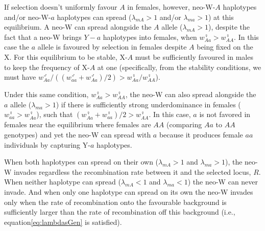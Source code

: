 \documentclass[12pt]{article}
\begin{document}
If selection doesn't uniformly favour $A$ in females, however, neo-W-$A$ haplotypes and/or neo-W-$a$ haplotypes can spread ($\lambda_{mA}>1$ and/or $\lambda_{ma}>1$) at this equilibrium.
A neo-W can spread alongside the $A$ allele ($\lambda_{mA}>1$), despite the fact that a neo-W brings $Y-a$ haplotypes into females, when $w_{Aa}^\female>w_{AA}^\female$.
In this case the $a$ allele is favoured by selection in females despite $A$ being fixed on the X.
For this equilibrium to be stable, X-$A$ must be sufficiently favoured in males to keep the frequency of X-$A$ at one (specifically, from the stability conditions, we must have $w_{Aa}^\male/((w_{aa}^\male+w_{Aa}^\male)/2)>w_{Aa}^\female/w_{AA}^\female$).

Under this same condition, $w_{Aa}^\female>w_{AA}^\female$, the neo-W can also spread alongside the $a$ allele ($\lambda_{ma}>1$) if there is sufficiently strong underdominance in females ($w_{aa}^\female>w_{Aa}^\female$), such that $(w_{Aa}^\female+w_{aa}^\female)/2>w_{AA}^\female$.  
In this case, $a$ is not favored in females near the equilibrium where females are $AA$ (comparing $Aa$ to $AA$ genotypes) and yet the neo-W can spread with $a$ because it produces female $aa$ individuals by capturing Y-$a$ haplotypes.

When both haplotypes can spread on their own ($\lambda_{mA}>1$ and $\lambda_{ma}>1$), the neo-W invades regardless the recombination rate between it and the selected locus, $R$.
When neither haplotype can spread ($\lambda_{mA}<1$ and $\lambda_{ma}<1$) the neo-W can never invade.
And when only one haplotype can spread on its own the neo-W invades only when the rate of recombination onto the favourable background is sufficiently larger than the rate of recombination off this background (i.e., equation\ref{eq:lambdasGen} is satisfied).

\end{document}
